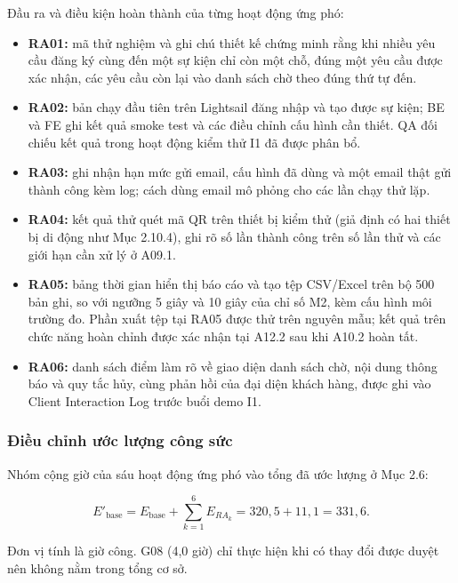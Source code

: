 Đầu ra và điều kiện hoàn thành của từng hoạt động ứng phó:

\begin{itemize}
    \item \textbf{RA01:} mã thử nghiệm và ghi chú thiết kế chứng minh rằng khi nhiều yêu cầu đăng ký cùng đến một sự kiện chỉ còn một chỗ, đúng một yêu cầu được xác nhận, các yêu cầu còn lại vào danh sách chờ theo đúng thứ tự đến.

    \item \textbf{RA02:} bản chạy đầu tiên trên Lightsail đăng nhập và tạo được sự kiện; BE và FE ghi kết quả smoke test và các điều chỉnh cấu hình cần thiết. QA đối chiếu kết quả trong hoạt động kiểm thử I1 đã được phân bổ.

    \item \textbf{RA03:} ghi nhận hạn mức gửi email, cấu hình đã dùng và một email thật gửi thành công kèm log; cách dùng email mô phỏng cho các lần chạy thử lặp.

    \item \textbf{RA04:} kết quả thử quét mã QR trên thiết bị kiểm thử (giả định có hai thiết bị di động như Mục 2.10.4), ghi rõ số lần thành công trên số lần thử và các giới hạn cần xử lý ở A09.1.

    \item \textbf{RA05:} bảng thời gian hiển thị báo cáo và tạo tệp CSV/Excel trên bộ 500 bản ghi, so với ngưỡng 5 giây và 10 giây của chỉ số M2, kèm cấu hình môi trường đo. Phần xuất tệp tại RA05 được thử trên nguyên mẫu; kết quả trên chức năng hoàn chỉnh được xác nhận tại A12.2 sau khi A10.2 hoàn tất.

    \item \textbf{RA06:} danh sách điểm làm rõ về giao diện danh sách chờ, nội dung thông báo và quy tắc hủy, cùng phản hồi của đại diện khách hàng, được ghi vào Client Interaction Log trước buổi demo I1.
\end{itemize}

\subsubsection{Điều chỉnh ước lượng công sức}

Nhóm cộng giờ của sáu hoạt động ứng phó vào tổng đã ước lượng ở Mục 2.6:

\[
E'_{\mathrm{base}}
=
E_{\mathrm{base}}
+
\sum_{k=1}^{6} E_{RA_k}
=
320{,}5+11{,}1
=
331{,}6.
\]

Đơn vị tính là giờ công. G08 (4,0 giờ) chỉ thực hiện khi có thay đổi được duyệt nên không nằm trong tổng cơ sở.

